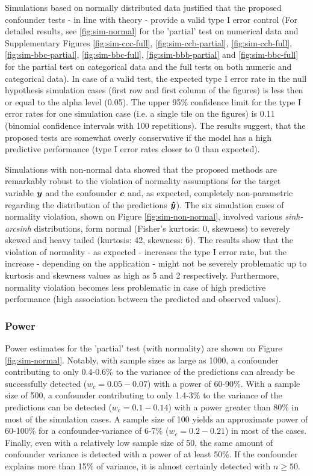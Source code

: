 \documentclass{article}
\begin{document}
Simulations based on normally distributed data justified that the proposed confounder tests - in line with theory - provide a valid type I error control (For detailed results, see \ref{fig:sim-normal} for the 'partial' test on numerical data and Supplementary Figures \ref{fig:sim-ccc-full}, \ref{fig:sim-ccb-partial}, \ref{fig:sim-ccb-full}, \ref{fig:sim-bbc-partial}, \ref{fig:sim-bbc-full}, \ref{fig:sim-bbb-partial} and \ref{fig:sim-bbc-full} for the partial test on categorical data and the full tests on both numeric and categorical data). 
In case of a valid test, the expected type I error rate in the null hypothesis simulation cases (first row and first column of the figures) is less then or equal to the alpha level (0.05). The upper 95\% confidence limit for the type I error rates for one simulation case (i.e. a single tile on the figures) is 0.11 (binomial confidence intervals with 100 repetitions). 
The results suggest, that the proposed tests are somewhat overly conservative if the model has a high predictive performance (type I error rates closer to 0 than expected).

Simulations with non-normal data showed that the proposed methods are remarkably robust to the violation of normality assumptions for the target variable $\boldsymbol{y}$ and the confounder $\boldsymbol{c}$ and, as expected, completely non-parametric regarding the distribution of the predictions $\boldsymbol{\hat{y}}$). The six simulation cases of normality violation, shown on Figure \ref{fig:sim-non-normal}, involved various \emph{sinh-arcsinh} distributions, form normal (Fisher's kurtosis: 0, skewness) to severely skewed and heavy tailed (kurtosis: 42, skewness: 6).
The results show that the violation of normality - as expected - increases the type I error rate, but the increase - depending on the application - might not be severely problematic up to kurtosis and skewness values as high as 5 and 2 respectively. Furthermore, normality violation becomes less problematic in case of high predictive performance (high association between the predicted and observed values).

\subsubsection*{Power}

Power estimates for the 'partial' test (with normality) are shown on Figure \ref{fig:sim-normal}. Notably, with sample sizes as large as 1000, a confounder contributing to only 0.4-0.6\% to the variance of the predictions can already be successfully detected ($w_c = 0.05 - 0.07$) with a power of 60-90\%. With a sample size of 500, a confounder contributing to only 1.4-3\% to the variance of the predictions can be detected ($w_c = 0.1 - 0.14$) with a power greater than 80\% in most of the simulation cases. A sample size of 100 yields an approximate power of 60-100\% for a confounder-variance of 6-7\% ($w_c = 0.2 - 0.21$) in most of the cases. Finally, even with a relatively low sample size of 50, the same amount of confounder variance is detected with a power of at least 50\%. If the confounder explains more than 15\% of variance, it is almost certainly detected with $n \geq 50$.
\end{document}
